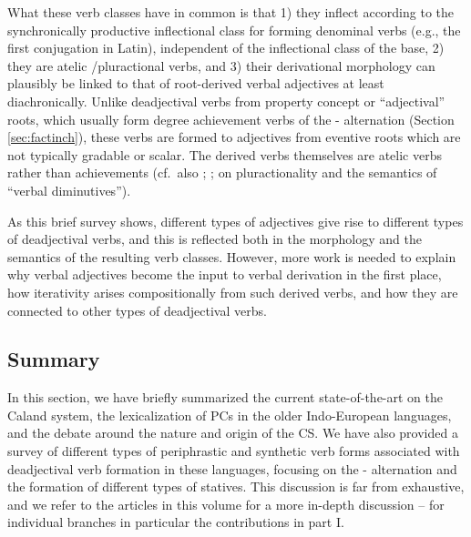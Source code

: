 \documentclass[output=paper,colorlinks,citecolor=brown]{langscibook}
\begin{document}
What these  verb classes have in common is that 1) they inflect according to the synchronically productive inflectional class for forming denominal verbs (e.g., the first conjugation in Latin), independent of the inflectional class of the base, 2) they are atelic /pluractional verbs, and 3) their derivational morphology can plausibly be linked to that of root-derived verbal adjectives at least diachronically. Unlike deadjectival verbs from property concept or ``adjectival'' roots, which usually form degree achievement verbs of the - alternation (Section \ref{sec:factinch}), these verbs are formed to adjectives from  eventive roots which are not typically gradable or scalar. The derived  verbs themselves are atelic  verbs rather than achievements (cf.\ also \citealt{Tovena2008}; \citealt{Tovena2010}; \citealt{GrestenbergerKallulli} on pluractionality and the semantics of ``verbal diminutives''). 

As this brief survey shows, different types of adjectives give rise to different types of deadjectival verbs, and this is reflected both in the morphology and the semantics of the resulting verb classes. However, more work is needed to explain why verbal adjectives become the input to verbal derivation in the first place, how iterativity arises compositionally from such derived verbs, and how they are connected to other types of deadjectival  verbs.


\subsection{Summary}

In this section, we have briefly summarized the current state-of-the-art on the Caland system,  the lexicalization of PCs in the older Indo-European languages, and the debate around the nature and origin of the CS. We have also provided a survey of different types of periphrastic and synthetic verb forms associated with deadjectival verb formation in these languages, focusing on the - alternation and the formation of different types of statives. This discussion is far from exhaustive, and we refer to the articles in this volume for a more in-depth discussion -- for individual branches in particular the contributions in part I. 
\end{document}
